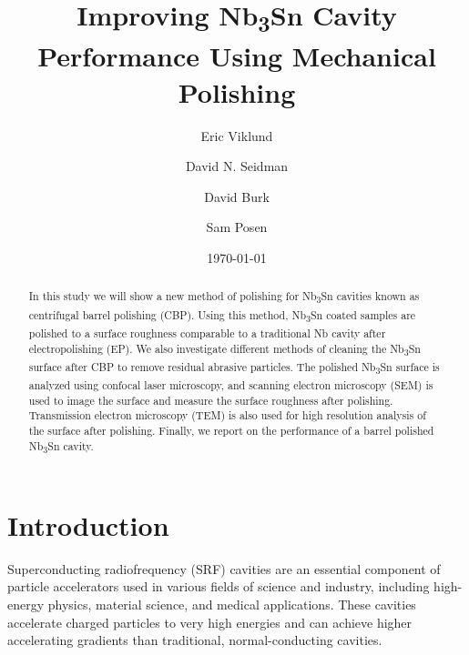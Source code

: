 \documentclass[reprint,amsmath,amssymb,aps]{revtex4-2}%
\begin{document}
%
\normalsize%
\title{Improving Nb\textsubscript{3}Sn Cavity Performance Using Mechanical Polishing}%
\author{Eric Viklund}%
%
%
\author{David N. Seidman}%
%
\author{David Burk}%
%
\author{Sam Posen}%
%
\date{\today}%

\begin{abstract}%
In this study we will show a new method of polishing for Nb\textsubscript{3}Sn cavities known as centrifugal barrel polishing (CBP). Using this method, Nb\textsubscript{3}Sn coated samples are polished to a surface roughness comparable to a traditional Nb cavity after electropolishing (EP). We also investigate different methods of cleaning the Nb\textsubscript{3}Sn surface after CBP to remove residual abrasive particles. The polished Nb\textsubscript{3}Sn surface is analyzed using confocal laser microscopy, and scanning electron microscopy (SEM) is used to image the surface and measure the surface roughness after polishing. Transmission electron microscopy (TEM) is also used for high resolution analysis of the surface after polishing. Finally, we report on the performance of a barrel polished Nb\textsubscript{3}Sn cavity.
%
\end{abstract}%

\maketitle%

\section{Introduction}%
\label{sec:Introduction}%
Superconducting radiofrequency (SRF) cavities are an essential component of particle accelerators used in various fields of science and industry, including high-energy physics, material science, and medical applications. These cavities accelerate charged particles to very high energies and can achieve higher accelerating gradients than traditional, normal-conducting cavities.
\end{document}
